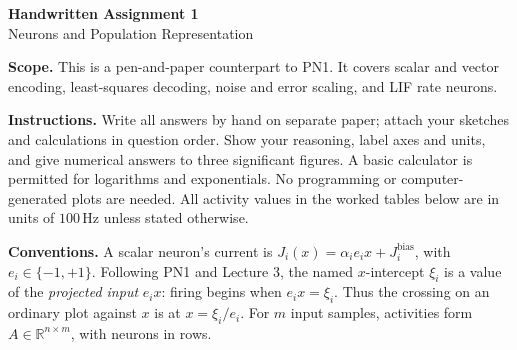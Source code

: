 \documentclass[11pt,letterpaper]{article}
\newcommand{\R}{\mathbb{R}}
\begin{document}
\begin{center}
{\Large\bfseries Handwritten Assignment 1}\\[2pt]
{\large Neurons and Population Representation}\\[4pt]
\end{center}
\noindent\textbf{Scope.} This is a pen-and-paper counterpart to PN1. It covers scalar and vector encoding, least-squares decoding, noise and error scaling, and LIF rate neurons.\par
\noindent\textbf{Instructions.} Write all answers by hand on separate paper; attach your sketches and calculations in question order. Show your reasoning, label axes and units, and give numerical answers to three significant figures. A basic calculator is permitted for logarithms and exponentials. No programming or computer-generated plots are needed. All activity values in the worked tables below are in units of \(100\,\mathrm{Hz}\) unless stated otherwise.\par
\noindent\textbf{Conventions.} A scalar neuron's current is \(J_i(x)=\alpha_i e_i x+J_i^{\mathrm{bias}}\), with \(e_i\in\{-1,+1\}\). Following PN1 and Lecture 3, the named \(x\)-intercept \(\xi_i\) is a value of the \emph{projected input} \(e_i x\): firing begins when \(e_i x=\xi_i\). Thus the crossing on an ordinary plot against \(x\) is at \(x=\xi_i/e_i\). For \(m\) input samples, activities form \(A\in\R^{n\times m}\), with neurons in rows.\par
\end{document}
